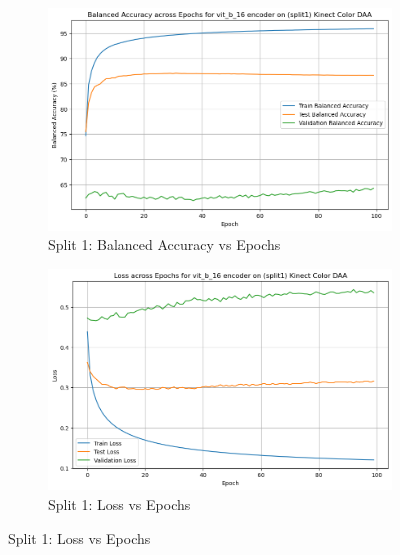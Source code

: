 \begin{figure}[htbp]
    \begin{subfigure}[b]{0.45\textwidth}
        \includegraphics[width=\textwidth]{Images_Thesis/Tensboard_runs_images_all/Experiment_01_Sup_D_A_with_Aug/Split_1/output_bal_acc_split_1_with_aug_d_a.png}
        \caption{Split 1: Balanced Accuracy vs Epochs}
        \label{fig:Exp_2_03}
    \end{subfigure}
    \hfill
    \begin{subfigure}[b]{0.45\textwidth}
        \includegraphics[width=\textwidth]{Images_Thesis/Tensboard_runs_images_all/Experiment_01_Sup_D_A_with_Aug/Split_1/output_loss_split_1_with_aug_d_a.png}
        \caption{Split 1:  Loss vs Epochs}
        \label{fig:Exp_2_04}
    \end{subfigure}


\end{figure}
